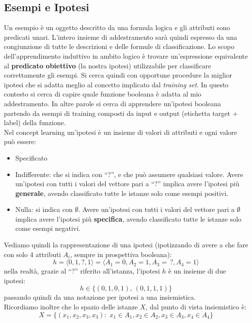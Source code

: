 \subsection{Esempi e Ipotesi}
Un esempio è un oggetto descritto da una formula logica e gli attributi sono predicati unari. L'intero insieme di addestramento sarà quindi espresso da una congiunzione di tutte le descrizioni e delle formule di classificazione. Lo scopo dell'apprendimento induttivo in ambito logico è trovare un'espressione equivalente al \textbf{predicato obiettivo} (la nostra ipotesi) utilizzabile per classificare correttamente gli esempi.
Si cerca quindi con opportune procedure la miglior ipotesi che si adatta
meglio al concetto implicato dal \textit{training set}.
In questo contesto si cerca di capire quale funzione booleana è adatta al mio addestramento. In altre parole si cerca di apprendere un'ipotesi booleana partendo da esempi di training composti da input e output (etichetta target + label) della funzione. \\
Nel concept learning un'ipotesi è un insieme di valori di attributi e ogni valore può essere:
\begin{itemize}
  \item Specificato
  \item Indifferente: che si indica con ``?'', e che può assumere qualsiasi
  valore. Avere un'ipotesi con tutti i valori del vettore pari a ``?'' implica
  avere l'ipotesi più \textbf{generale}, avendo classificato tutte le istanze solo come
  esempi positivi. 
  \item Nulla: si indica con $\emptyset$. Avere un'ipotesi con tutti i valori
  del vettore pari a $\emptyset$ implica avere l'ipotesi più \textbf{specifica}, avendo
  classificato tutte le istanze solo come esempi negativi. 
\end{itemize}
\begin{esempio}
  Vediamo quindi la rappresentazione di una ipotesi (ipotizzando di avere a che
  fare con solo 4 attributi $A_i$, sempre in prospettiva booleana):
  \[h=\langle 0, 1, ?, 1\rangle = \langle A_1=0, A_2=1, A_3=\,?, A_4=1\rangle\]
  nella realtà, grazie al ``?'' riferito all'istanza, l'ipotesi $h$ è un insieme
  di due ipotesi: 
  \[h\in\{(0, 1, 0, 1),\,(0, 1, 1, 1)\}\]
  passando quindi da una notazione per ipotesi a una insiemistica.\\
  Ricordiamo inoltre che lo spazio delle istanze $X$, dal punto di vista
  insiemistico è:
  \[X=\{(x_1, x_2, x_3, x_3): \,\, x_1\in A_1, x_2\in A_2, x_3\in A_3, x_4\in A_4\}\]
\end{esempio}
